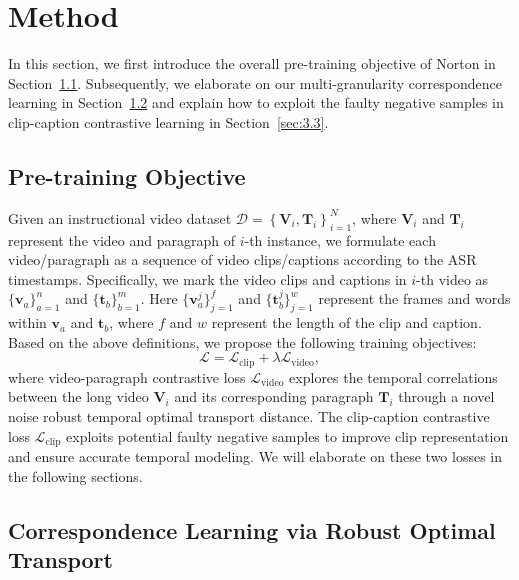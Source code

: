 \section{Method}

\label{sec:method}

In this section, we first introduce the overall pre-training objective of Norton in Section~\ref{sec:3.1}. Subsequently, we elaborate on our multi-granularity correspondence learning in Section~\ref{sec:3.2} and explain how to exploit the faulty negative samples in clip-caption contrastive learning in Section~\ref{sec:3.3}. 

\subsection{Pre-training Objective}
\label{sec:3.1}

Given an instructional video dataset $\mathcal{D}=\left\{\mathbf{V}_i, \mathbf{T}_i\right\}_{i=1}^N$, where $\mathbf{V}_i$ and $\mathbf{T}_i$ represent the video and paragraph of $i$-th instance, we formulate each video/paragraph as a sequence of video clips/captions according to the ASR timestamps. Specifically, we mark the video clips and captions in $i$-th video as $\{\mathbf{v}_a\}_{a=1}^n$ and $\{\mathbf{t}_b\}_{b=1}^m$. Here $\{\mathbf{v}_a^j\}_{j=1}^f$ and $\{\mathbf{t}_b^j\}_{j=1}^w$ represent the frames and words within $\mathbf{v}_a$ and $\mathbf{t}_b$, where $f$ and $w$ represent the length of the clip and caption. Based on the above definitions, we propose the following training objectives:
\begin{equation}
  \mathcal{L}=\mathcal{L}_{\text{clip}}+\lambda \mathcal{L}_{\text{video}},
\end{equation}
where video-paragraph contrastive loss $\mathcal{L}_{\text{video}}$ explores the temporal correlations between the long video $\mathbf{V}_i$ and its corresponding paragraph $\mathbf{T}_i$ through a novel noise robust temporal optimal transport distance. The clip-caption contrastive loss $\mathcal{L}_{\text{clip}}$ exploits potential faulty negative samples to improve clip representation and ensure accurate temporal modeling. We will elaborate on these two losses in the following sections.

\subsection{Correspondence Learning via Robust Optimal Transport}
\label{sec:3.2}

